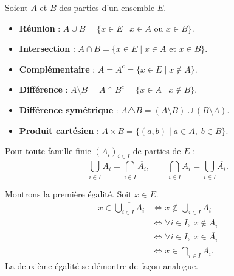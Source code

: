 \documentclass[11pt,a4paper,twoside]{book}
\begin{document}
\begin{definitionbox}
Soient $A$ et $B$ des parties d'un ensemble $E$.
\begin{itemize}
  \item \textbf{Réunion} : $A \cup B = \{x \in E \mid x \in A \text{ ou } x \in B\}$.
  \item \textbf{Intersection} : $A \cap B = \{x \in E \mid x \in A \text{ et } x \in B\}$.
  \item \textbf{Complémentaire} : $\overline{A} = A^c = \{x \in E \mid x \notin A\}$.
  \item \textbf{Différence} : $A \setminus B = A \cap B^c = \{x \in A \mid x \notin B\}$.
  \item \textbf{Différence symétrique} : $A \triangle B = (A \setminus B) \cup (B \setminus A)$.
  \item \textbf{Produit cartésien} : $A \times B = \{(a,b) \mid a \in A,\; b \in B\}$.
\end{itemize}
\end{definitionbox}

\begin{propositionbox}
Pour toute famille finie $(A_i)_{i \in I}$ de parties de $E$ :
\[
  \overline{\bigcup_{i \in I} A_i} = \bigcap_{i \in I} \overline{A_i},
  \qquad
  \overline{\bigcap_{i \in I} A_i} = \bigcup_{i \in I} \overline{A_i}.
\]
\end{propositionbox}

\begin{preuvebox}
Montrons la première égalité. Soit $x \in E$.
\begin{align*}
  x \in \overline{\bigcup_{i \in I} A_i}
  &\Leftrightarrow x \notin \bigcup_{i \in I} A_i \\
  &\Leftrightarrow \forall i \in I,\; x \notin A_i \\
  &\Leftrightarrow \forall i \in I,\; x \in \overline{A_i} \\
  &\Leftrightarrow x \in \bigcap_{i \in I} \overline{A_i}.
\end{align*}
La deuxième égalité se démontre de façon analogue.
\end{preuvebox}
\end{document}
